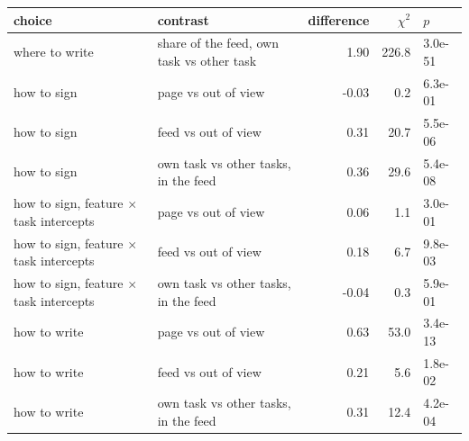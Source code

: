 \begin{tabular}{llrrl}
\toprule
choice & contrast & difference & $\chi^2$ & $p$ \\
\midrule
where to write & share of the feed, own task vs other task & 1.90 & 226.8 & 3.0e-51 \\
how to sign & page vs out of view & -0.03 & 0.2 & 6.3e-01 \\
how to sign & feed vs out of view & 0.31 & 20.7 & 5.5e-06 \\
how to sign & own task vs other tasks, in the feed & 0.36 & 29.6 & 5.4e-08 \\
how to sign, feature $\times$ task intercepts & page vs out of view & 0.06 & 1.1 & 3.0e-01 \\
how to sign, feature $\times$ task intercepts & feed vs out of view & 0.18 & 6.7 & 9.8e-03 \\
how to sign, feature $\times$ task intercepts & own task vs other tasks, in the feed & -0.04 & 0.3 & 5.9e-01 \\
how to write & page vs out of view & 0.63 & 53.0 & 3.4e-13 \\
how to write & feed vs out of view & 0.21 & 5.6 & 1.8e-02 \\
how to write & own task vs other tasks, in the feed & 0.31 & 12.4 & 4.2e-04 \\
\bottomrule
\end{tabular}
